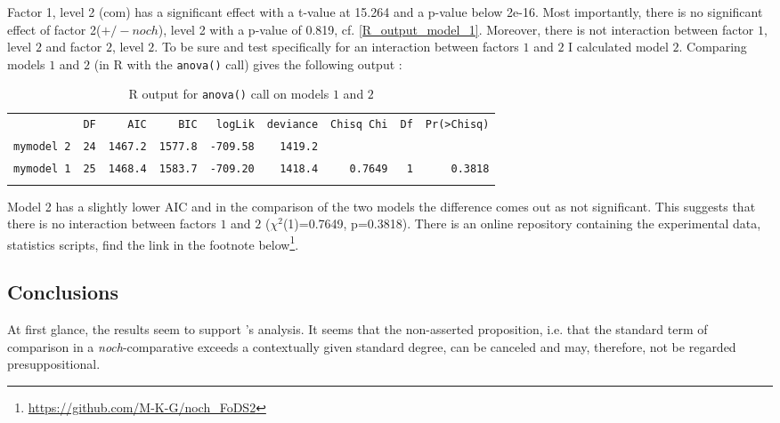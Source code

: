 \documentclass[output=paper,
modfonts
]{langscibook}
\begin{document}
\noindent Factor 1, level 2 (com) has a significant effect with a t-value at 15.264 and a p-value below 2e-16. Most importantly, there is no significant effect of factor 2($+/-noch$), level 2 with a p-value of 0.819, cf. \ref{R_output_model_1}. Moreover, there is not interaction between factor $1$, level $2$ and factor $2$, level $2$. To be sure and test specifically for an interaction between factors $1$ and $2$ I calculated model $2$. Comparing models $1$ and $2$ (in R with the \texttt{anova()} call) gives the following output \citep[cf.][]{winter2013}:

\begin{table}[H]\scriptsize
\begin{tabular}{lrrrrrrrr}
               & \texttt{DF} & \texttt{AIC}    & \texttt{BIC}    & \texttt{logLik}  & \texttt{deviance} & \texttt{Chisq Chi} & \texttt{Df} & \texttt{Pr(>Chisq)} \\
\texttt{mymodel 2}  & \texttt{24} & \texttt{1467.2} & \texttt{1577.8} & \texttt{-709.58} & \texttt{1419.2}   &               &        &                \\
\texttt{mymodel 1}  & \texttt{25} & \texttt{1468.4} & \texttt{1583.7} & \texttt{-709.20} & \texttt{1418.4}   & \texttt{0.7649}    & \texttt{1}  & \texttt{0.3818}     \\
\caption{R output for \texttt{anova()} call on models $1$ and $2$}
\label{R_output_anova_model_1_and_2}
\end{tabular}
\end{table}

Model 2 has a slightly lower AIC and in the comparison of the two models the difference comes out as not significant. This suggests that there is no interaction between factors $1$ and $2$ ($\chi^{2}$(1)=0.7649, p=0.3818). There is an online repository containing the experimental data, statistics scripts, find the link in the footnote below\footnote{\url{https://github.com/M-K-G/noch_FoDS2}}\citet{github_website}.

\subsection{Conclusions}
At first glance, the results seem to support \citeauthor{umbach2009a_comp}'s \citeyearpar{umbach2009a_comp} analysis. It seems that the non-asserted proposition, i.e. that the standard term of comparison in a \textit{noch}-comparative exceeds a contextually given standard degree, can be canceled and may, therefore, not be regarded presuppositional.
\end{document}
